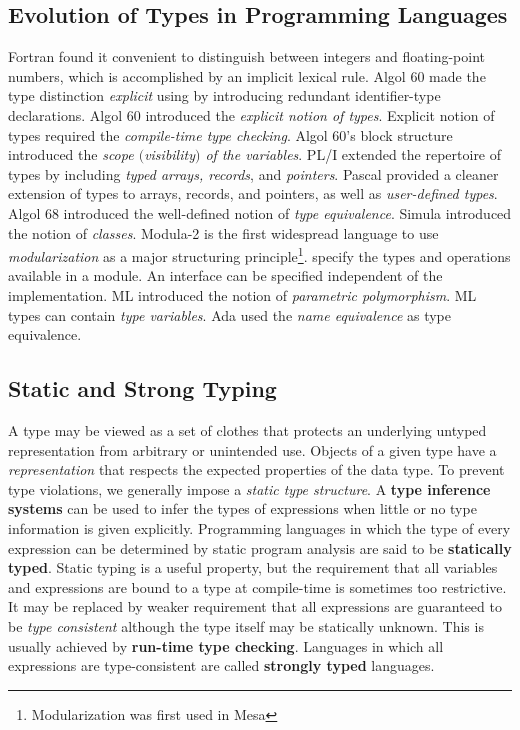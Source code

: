 \documentclass{article}
\begin{document}
\subsection{Evolution of Types in Programming Languages}
\bit
\w Fortran found it convenient to distinguish between integers
	and floating-point numbers, which is accomplished by
	an implicit lexical rule.
\w Algol 60 made the type distinction {\em{}explicit\/} using
	by introducing redundant identifier-type declarations.
	\bit
	\w Algol 60 introduced the {\em{}explicit notion of types\/}.
	\w Explicit notion of types required the {\em{}compile-time
		type checking\/}.
	\w Algol 60's block structure introduced the {\em{}scope
		$($visibility$)$ of the variables\/}.
	\eit
\w PL/I extended the repertoire of types by including
	{\em{}typed arrays, records\/}, and {\em{}pointers\/}.
\w Pascal provided a cleaner extension of types to arrays, records,
	and pointers, as well as {\em{}user-defined types\/}.
\w Algol 68 introduced the well-defined notion of 
	{\em{}type equivalence\/}.
\w Simula introduced the notion of {\em{}classes\/}.
\w Modula-2 is the first widespread language to use {\em{}modularization\/}
	as a major structuring principle\footnote{Modularization was
	first used in Mesa}.
	\bit
	 specify the types and operations
		available in a module.
	\w An interface can be specified independent of the implementation.
	\eit
\w ML introduced the notion of {\em{}parametric polymorphism\/}.
	\bit
	\w ML types can contain {\em{}type variables\/}.
	\eit
\w Ada used the {\em{}name equivalence\/} as type equivalence.
\eit

\subsection{Static and Strong Typing}
\bit
\w A type may be viewed as a set of clothes that protects an underlying
	untyped representation from arbitrary or unintended use.
\w Objects of a given type have a {\em{}representation\/} that respects
	the expected properties of the data type.
\w To prevent type violations, we generally impose a {\em{}static type
	structure\/}.
\w A {\bf{}type inference systems\/} can be used to infer the types of
	expressions when little or no type information is given 
	explicitly.
\w Programming languages in which the type of every expression can be
	determined by static program analysis are said to be
	{\bf{}statically typed}.
	\bit
	\w Static typing is a useful property, but the requirement that
		all variables and expressions are bound to a type at 
		compile-time is sometimes too restrictive.
	\w It may be replaced by weaker requirement that all expressions
		are guaranteed to be {\em{}type consistent\/} although the
		type itself may be statically unknown. This is usually
		achieved by {\bf{}run-time type checking}.
	\eit
\w Languages in which all expressions are type-consistent are 
	called {\bf{}strongly typed} languages.
\eit
\end{document}
